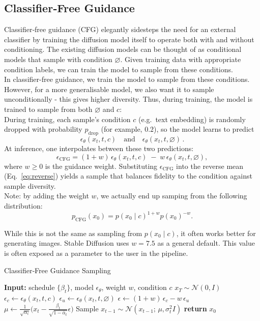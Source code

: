 \documentclass[11pt,a4paper]{article}
\begin{document}
\newpage

\subsection{Classifier‐Free Guidance}

Classifier‐free guidance (CFG) \cite{ho2022classifierfree} elegantly sidesteps the need for an external classifier by training the diffusion model itself to operate both with and without conditioning. The existing diffusion models can be thought of as conditional models that sample with condition $\varnothing$. Given training data with appropriate condition labels, we can train the model to sample from these conditions.\\

In classifier-free guidance, we train the model to sample from these conditions. However, for a more generalisable model, we also want it to sample unconditionally - this gives higher diversity. Thus, during training, the model is trained to sample from both $\varnothing$ and $c$:\\


During training, each sample's condition $c$ (e.g.\ text embedding) is randomly dropped with probability $p_\text{drop}$ (for example, $0.2$), so the model learns to predict
\[
\epsilon_\theta(x_t,t,c)\quad\text{and}\quad\epsilon_\theta(x_t,t,\varnothing)\,.
\]
At inference, one interpolates between these two predictions:
\begin{equation}\label{eq:cfg}
\epsilon_{\mathrm{CFG}}
=(1+w)\,\epsilon_\theta(x_t,t,c)\;-\;w\,\epsilon_\theta(x_t,t,\varnothing),
\end{equation}
where $w\ge0$ is the guidance weight.  Substituting $\epsilon_{\mathrm{CFG}}$ into the reverse mean (Eq.~\ref{eq:reverse}) yields a sample that balances fidelity to the condition against sample diversity.\\

Note: by adding the weight $w$, we actually end up samping from the following distribution:
\[
p_{\mathrm{CFG}}(x_0) = p(x_0\mid c)^{1+w}p(x_0)^{-w}.
\]

While this is not the same as sampling from $p(x_0\mid c)$, it often works better for generating images. Stable Diffusion uses $w=7.5$ as a general default. This value is often exposed as a parameter to the user in the pipeline.

\begin{algorithm}[htb]
\caption{Classifier‐Free Guidance Sampling}\label{alg:cfg}
\begin{algorithmic}[1]
  \STATE \textbf{Input:} schedule $\{\beta_t\}$, model $\epsilon_\theta$, weight $w$, condition $c$
  \STATE $x_T \sim \mathcal{N}(0,I)$
    \STATE $\epsilon_c \leftarrow \epsilon_\theta(x_t,t,c)$
    \STATE $\epsilon_u \leftarrow \epsilon_\theta(x_t,t,\varnothing)$
    \STATE $\epsilon \leftarrow (1+w)\,\epsilon_c - w\,\epsilon_u$
    \STATE $\mu \leftarrow \frac{1}{\sqrt{\alpha_t}}\bigl(x_t - \tfrac{\beta_t}{\sqrt{1-\bar\alpha_t}}\epsilon\bigr)$
    \STATE Sample $x_{t-1}\sim\mathcal{N}(x_{t-1};\,\mu,\sigma_t^2 I)$
  \ENDFOR
  \STATE \textbf{return} $x_0$
\end{algorithmic}
\end{algorithm}
\end{document}
